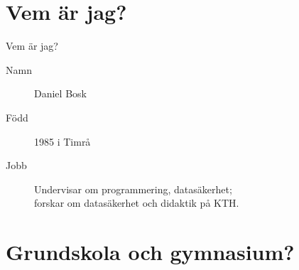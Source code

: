 \mode*

\begin{frame}
  \tableofcontents
\end{frame}

\section{Vem är jag?}


\begin{frame}
  \begin{block}{Vem är jag?}
    \begin{description}
      \item[Namn] Daniel Bosk
      \item[Född] 1985 i Timrå
      \item[Jobb] Undervisar om programmering, datasäkerhet;\\
        forskar om datasäkerhet och didaktik på KTH.
    \end{description}
  \end{block}
\end{frame}

\section{Grundskola och gymnasium?}

